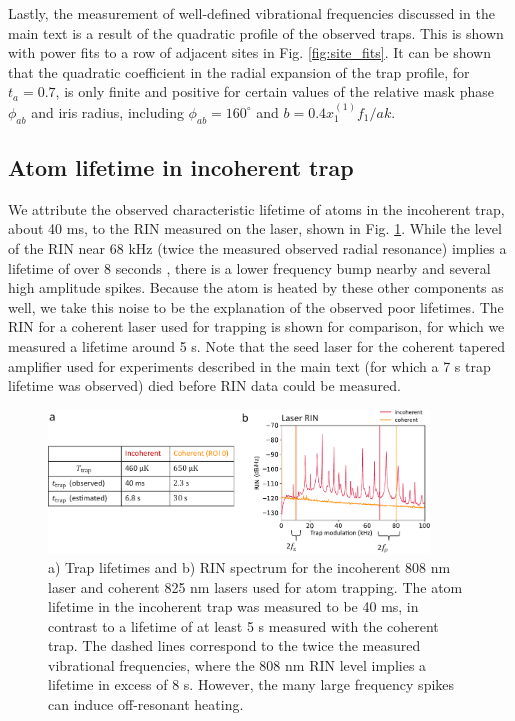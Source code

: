 Lastly, the measurement of well-defined vibrational frequencies discussed in the main text is a result of the quadratic profile of the observed traps. This is shown with power fits to a row of adjacent sites in Fig. \ref{fig:site_fits}. It can be shown that the quadratic coefficient in the radial expansion of the trap profile, for $t_a=0.7$, is only finite and positive for certain values of the relative mask phase $\phi_{ab}$ and iris radius, including $\phi_{ab}=160^{\circ}$ and $b=0.4x^{(1)}_1 f_1/a k$.

\subsection{Atom lifetime in incoherent trap}\label{sub:lifetime}
We attribute the observed characteristic lifetime of atoms in the incoherent trap, about 40 ms, to the RIN measured on the laser, shown in Fig. \ref{fig:rin}. While the level of the RIN near 68 kHz (twice the measured observed radial resonance) implies a lifetime of over 8 seconds \cite{Gehm1998}, there is a lower frequency bump nearby and several high amplitude spikes. Because the atom is heated by these other components as well, we take this noise to be the explanation of the observed poor lifetimes.
The RIN for a coherent laser used for trapping is shown for comparison, for which we measured a lifetime around 5 s. Note that the seed laser for the coherent tapered amplifier used for experiments described in the main text (for which a 7 s trap lifetime was observed) died before RIN data could be measured. 

\begin{figure}[t!]
    \centering
    \includegraphics[width=0.9\textwidth]{Images/trap_array_frequencies_and_lifetimes.pdf}
    \caption{a) Trap lifetimes and b) RIN spectrum for the incoherent 808 nm laser and coherent 825 nm lasers used for atom trapping. The  atom lifetime in the incoherent trap was measured to be 40 ms, in contrast to a lifetime of at least 5 s measured with the coherent trap. The dashed lines correspond to the twice the measured vibrational frequencies, where the 808 nm RIN level implies a lifetime in excess of 8 s. However, the many large frequency spikes can induce off-resonant heating.}
    \label{fig:rin}
\end{figure}

